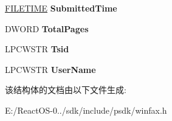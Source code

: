 \begin{DoxyCompactItemize}
\hyperlink{struct___f_i_l_e_t_i_m_e}{F\+I\+L\+E\+T\+I\+ME} {\bfseries Submitted\+Time}
\item 
\mbox{\label{struct___f_a_x___d_e_v_i_c_e___s_t_a_t_u_s_w_adff9ab18cfe0450e8a46a877ea576cb7}} 
D\+W\+O\+RD {\bfseries Total\+Pages}
\item 
\mbox{\label{struct___f_a_x___d_e_v_i_c_e___s_t_a_t_u_s_w_aa6d9f8275bdbc0695fd6d407f7ed2f6f}} 
L\+P\+C\+W\+S\+TR {\bfseries Tsid}
\item 
\mbox{\label{struct___f_a_x___d_e_v_i_c_e___s_t_a_t_u_s_w_a5328e085c491ecdd8f6d6b50cf2cca27}} 
L\+P\+C\+W\+S\+TR {\bfseries User\+Name}
\end{DoxyCompactItemize}


该结构体的文档由以下文件生成\+:\begin{DoxyCompactItemize}
\item 
E\+:/\+React\+O\+S-\/0../sdk/include/psdk/winfax.\+h\end{DoxyCompactItemize}
